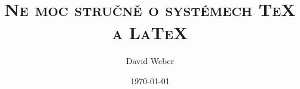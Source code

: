 \title[O \TeX u a \LaTeX u]{\textsc{Ne moc stručně o systémech \TeX{} a \LaTeX{}}}
\author{David Weber}
\date{\today}